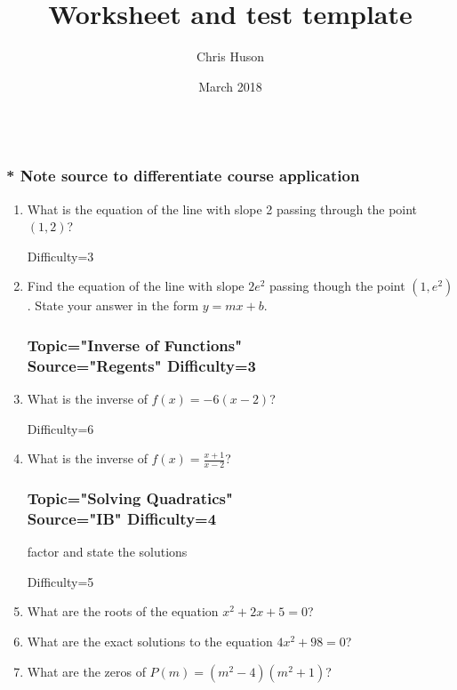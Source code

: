 \documentclass[12pt, oneside]{article}
\title{Worksheet and test template}
\author{Chris Huson}
\date{March 2018}
\begin{document}
\subsubsection*{\\* Note source to differentiate course application}
\begin{enumerate}

\subsubsection*{Topic="Writing Linear Equations"\\
Source="cjh" 
Difficulty=2}

\item What is the equation of the line with slope 2 passing through the point $(1, 2)$?

Difficulty=3
\item Find the equation of the line with slope $2e^2$ passing though the point $(1, e^2)$. State your answer in the form $y=mx+b$.

\subsubsection*{Topic="Inverse of Functions"\\
Source="Regents" 
Difficulty=3}

\item What is the inverse of $f(x)=-6(x-2)$? %

Difficulty=6
\item What is the inverse of $\displaystyle f(x)=\frac{x+1}{x-2}$? %

\subsubsection*{Topic="Solving Quadratics"\\
Source="IB" 
Difficulty=4}
factor and state the solutions

Difficulty=5
\item What are the roots of the equation $x^2+ 2x+5 =0$? %

\item What are the exact solutions to the equation $4x^2+98=0$? %

\item What are the zeros of $P(m) = (m^2 - 4)(m^2+ 1)$? %


\end{enumerate}
\end{document}

